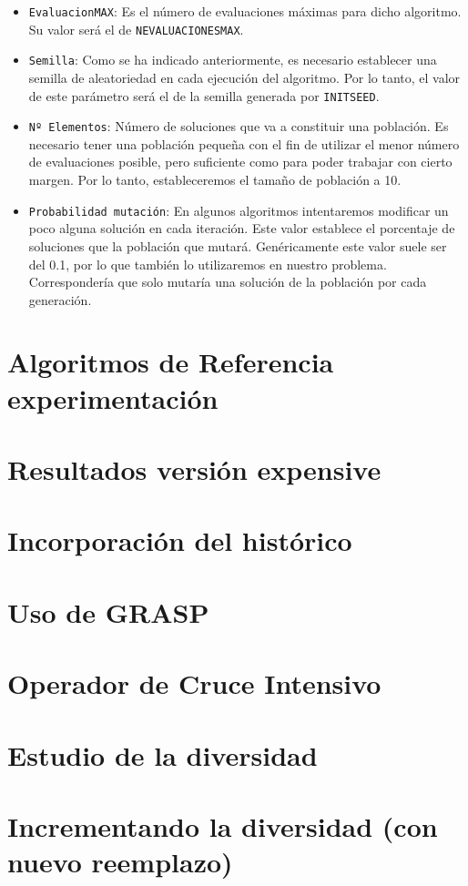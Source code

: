 \begin{itemize}
	\item \texttt{EvaluacionMAX}: Es el número de evaluaciones máximas para dicho algoritmo. 
Su valor será el de \texttt{NEVALUACIONESMAX}.
	\item \texttt{Semilla}: Como se ha indicado anteriormente, es necesario establecer una semilla de aleatoriedad en cada ejecución del algoritmo. 
Por lo tanto, el valor de este parámetro será el de la semilla generada por \texttt{INITSEED}. 
	\item \texttt{Nº Elementos}: Número de soluciones que va a constituir una población. 
Es necesario tener una población pequeña con el fin de utilizar el menor número de evaluaciones posible, pero suficiente como para poder trabajar con cierto margen. 
Por lo tanto, estableceremos el tamaño de población a 10. 
	\item \texttt{Probabilidad mutación}: En algunos algoritmos intentaremos modificar un poco alguna solución en cada iteración. 
Este valor establece el porcentaje de soluciones que la población que mutará. 
Genéricamente este valor suele ser del 0.1, por lo que también lo utilizaremos en nuestro problema. 
Correspondería que solo mutaría una solución de la población por cada generación. 
\end{itemize}
\section{Algoritmos de Referencia experimentación}

\section{Resultados versión expensive}

\section{Incorporación del histórico}

\section{Uso de GRASP}

\section{Operador de Cruce Intensivo}

\section{Estudio de la diversidad}

\section{Incrementando la diversidad (con nuevo reemplazo)}